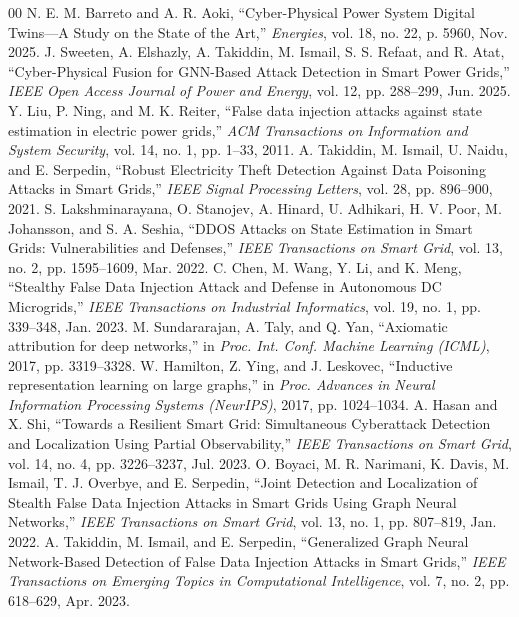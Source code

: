 \documentclass[conference]{IEEEtran}
\begin{document}
\begin{thebibliography}{00}
 N. E. M. Barreto and A. R. Aoki, ``Cyber-Physical Power System Digital Twins---A Study on the State of the Art,'' \emph{Energies}, vol. 18, no. 22, p. 5960, Nov. 2025.
 J. Sweeten, A. Elshazly, A. Takiddin, M. Ismail, S. S. Refaat, and R. Atat, ``Cyber-Physical Fusion for GNN-Based Attack Detection in Smart Power Grids,'' \emph{IEEE Open Access Journal of Power and Energy}, vol. 12, pp. 288--299, Jun. 2025.
 Y. Liu, P. Ning, and M. K. Reiter, ``False data injection attacks against state estimation in electric power grids,'' \emph{ACM Transactions on Information and System Security}, vol. 14, no. 1, pp. 1--33, 2011.
 A. Takiddin, M. Ismail, U. Naidu, and E. Serpedin, ``Robust Electricity Theft Detection Against Data Poisoning Attacks in Smart Grids,'' \emph{IEEE Signal Processing Letters}, vol. 28, pp. 896--900, 2021.
 S. Lakshminarayana, O. Stanojev, A. Hinard, U. Adhikari, H. V. Poor, M. Johansson, and S. A. Seshia, ``DDOS Attacks on State Estimation in Smart Grids: Vulnerabilities and Defenses,'' \emph{IEEE Transactions on Smart Grid}, vol. 13, no. 2, pp. 1595--1609, Mar. 2022.
 C. Chen, M. Wang, Y. Li, and K. Meng, ``Stealthy False Data Injection Attack and Defense in Autonomous DC Microgrids,'' \emph{IEEE Transactions on Industrial Informatics}, vol. 19, no. 1, pp. 339--348, Jan. 2023.
 M. Sundararajan, A. Taly, and Q. Yan, ``Axiomatic attribution for deep networks,'' in \emph{Proc. Int. Conf. Machine Learning (ICML)}, 2017, pp. 3319--3328.
 W. Hamilton, Z. Ying, and J. Leskovec, ``Inductive representation learning on large graphs,'' in \emph{Proc. Advances in Neural Information Processing Systems (NeurIPS)}, 2017, pp. 1024--1034.
 A. Hasan and X. Shi, ``Towards a Resilient Smart Grid: Simultaneous Cyberattack Detection and Localization Using Partial Observability,'' \emph{IEEE Transactions on Smart Grid}, vol. 14, no. 4, pp. 3226--3237, Jul. 2023.
 O. Boyaci, M. R. Narimani, K. Davis, M. Ismail, T. J. Overbye, and E. Serpedin, ``Joint Detection and Localization of Stealth False Data Injection Attacks in Smart Grids Using Graph Neural Networks,'' \emph{IEEE Transactions on Smart Grid}, vol. 13, no. 1, pp. 807--819, Jan. 2022.
 A. Takiddin, M. Ismail, and E. Serpedin, ``Generalized Graph Neural Network-Based Detection of False Data Injection Attacks in Smart Grids,'' \emph{IEEE Transactions on Emerging Topics in Computational Intelligence}, vol. 7, no. 2, pp. 618--629, Apr. 2023.

\end{thebibliography}
\end{document}
